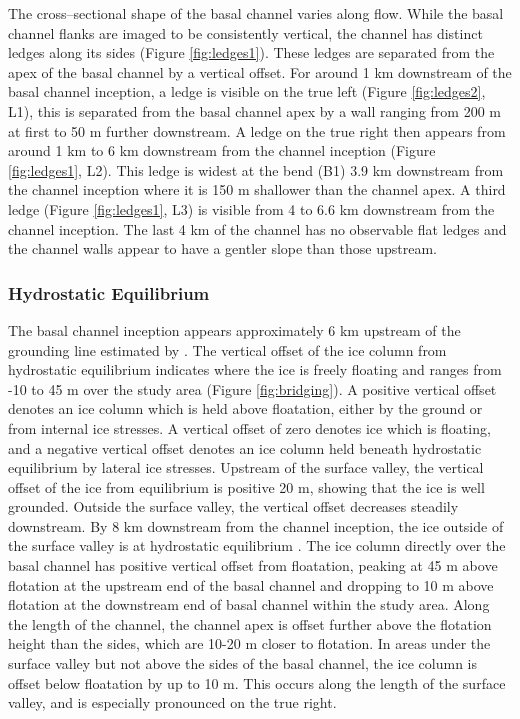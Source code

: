 The cross--sectional shape of the basal channel varies along flow. While the basal channel flanks are imaged to be consistently vertical, the channel has distinct ledges along its sides (Figure \ref{fig:ledges1}). These ledges are separated from the apex of the basal channel by a vertical offset. For around 1 km downstream of the basal channel inception, a ledge is visible on the true left (Figure \ref{fig:ledges2}, L1), this is separated from the basal channel apex by a wall ranging from 200 m at first to 50 m further downstream. A ledge on the true right then appears from around 1 km to 6 km downstream from the channel inception (Figure \ref{fig:ledges1}, L2). This ledge is widest at the bend (B1) 3.9 km downstream from the channel inception  where it is 150 m shallower than the channel apex. A third ledge (Figure \ref{fig:ledges1}, L3) is visible from 4 to 6.6 km downstream  from the channel inception.  The last 4 km of the channel has no observable flat ledges and the channel walls appear to have a gentler slope than those upstream.

\subsubsection{Hydrostatic Equilibrium} \label{sec:floating}

The basal channel inception appears approximately 6 km upstream of the grounding line estimated by \cite{depoorter2013amii}. 
The vertical offset of the ice column from hydrostatic equilibrium indicates where the ice is freely floating and ranges from -10 to 45 m over the study area (Figure \ref{fig:bridging}).
A positive vertical offset denotes an ice column which is held above floatation, either by the ground or from internal ice stresses. A vertical offset of zero denotes ice which is floating, and a negative vertical offset denotes an ice column held beneath hydrostatic equilibrium by lateral ice stresses. 
Upstream of the surface valley, the vertical offset of the ice from equilibrium is positive 20 m, showing that the ice is well grounded. Outside the surface valley,  the vertical offset decreases steadily downstream. By 8 km downstream from the channel inception, the ice outside of the surface valley is at hydrostatic equilibrium . The ice column directly over the basal channel has positive vertical offset from floatation, peaking at 45 m above flotation at the upstream end of the basal channel and dropping to 10 m above flotation at the downstream end of basal channel within the study area. Along the length of the channel, the channel apex is offset further above the flotation height than the sides, which are 10-20 m closer to flotation. In areas under the surface valley but not above the sides of the basal channel, the ice column is offset below floatation by up to 10 m. This occurs along the length of the surface valley, and is especially pronounced on the true right.

